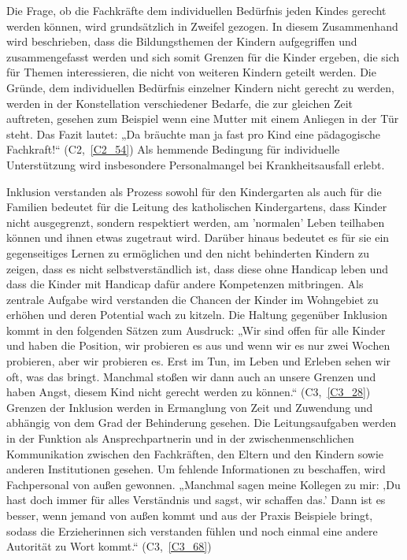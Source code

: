 Die Frage, ob die Fachkräfte dem individuellen Bedürfnis jeden Kindes gerecht werden können, wird grundsätzlich in Zweifel gezogen. In diesem Zusammenhand wird beschrieben, dass die Bildungsthemen der Kindern aufgegriffen und zusammengefasst werden und sich somit Grenzen für die Kinder ergeben, die sich für Themen interessieren, die nicht von weiteren Kindern geteilt werden. Die Gründe, dem individuellen Bedürfnis einzelner Kindern nicht gerecht zu werden, werden in der Konstellation verschiedener Bedarfe, die zur gleichen Zeit auftreten, gesehen zum Beispiel wenn eine Mutter mit einem Anliegen in der Tür steht. Das Fazit lautet: „Da bräuchte man ja fast pro Kind eine pädagogische Fachkraft!“ (C2,~\ref{C2_54}) 
Als hemmende Bedingung für individuelle Unterstützung wird insbesondere Personalmangel bei Krankheitsausfall erlebt.

Inklusion verstanden als Prozess sowohl für den Kindergarten als auch für die Familien bedeutet für die Leitung des katholischen Kindergartens, dass Kinder nicht ausgegrenzt, sondern respektiert werden, am 'normalen' Leben teilhaben können und ihnen etwas zugetraut wird. Darüber hinaus bedeutet es für sie ein gegenseitiges Lernen zu ermöglichen und den nicht behinderten Kindern zu zeigen, dass es nicht selbstverständlich ist, dass diese ohne Handicap leben und dass die Kinder mit Handicap dafür andere Kompetenzen mitbringen. Als zentrale Aufgabe wird verstanden die Chancen der Kinder im Wohngebiet zu erhöhen und deren Potential wach zu kitzeln.
Die Haltung gegenüber Inklusion kommt in den folgenden Sätzen zum Ausdruck: „Wir sind offen für alle Kinder und haben die Position, wir probieren es aus und wenn wir es nur zwei Wochen probieren, aber wir probieren es. Erst im Tun, im Leben und Erleben sehen wir oft, was das bringt. Manchmal stoßen wir dann auch an unsere Grenzen und haben Angst, diesem Kind nicht gerecht werden zu können.“ (C3,~\ref{C3_28}) Grenzen der Inklusion werden in Ermanglung von Zeit und Zuwendung und abhängig von dem Grad der Behinderung gesehen.  
Die Leitungsaufgaben werden in der Funktion als Ansprechpartnerin und in der zwischenmenschlichen Kommunikation zwischen den Fachkräften, den Eltern und den Kindern sowie anderen Institutionen gesehen. Um fehlende Informationen zu beschaffen, wird Fachpersonal von außen gewonnen.
„Manchmal sagen meine Kollegen zu mir: ‚Du hast doch immer für alles Verständnis und sagst, wir schaffen das.’ Dann ist es besser, wenn jemand von außen kommt und aus der Praxis Beispiele bringt, sodass die Erzieherinnen sich verstanden fühlen und noch einmal eine andere Autorität zu Wort kommt.“ (C3,~\ref{C3_68}) 

